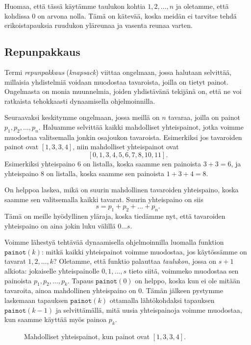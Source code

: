 Huomaa, että tässä käytämme taulukon kohtia $1,2,\dots,n$
ja oletamme, että kohdissa $0$ on arvona nolla.
Tämä on kätevää, koska meidän ei tarvitse tehdä erikoistapauksia
ruudukon yläreunaa ja vasenta reunaa varten.

\subsection{Repunpakkaus}


Termi \emph{repunpakkaus} (\emph{knapsack}) viittaa ongelmaan,
jossa halutaan selvittää, millaisia yhdistelmiä voidaan muodostaa tavaroista,
joilla on tietyt painot.
Ongelmasta on monia muunnelmia, joiden yhdistävänä tekijänä on,
että ne voi ratkaista tehokkaasti dynaamisella ohjelmoinnilla.

Seuraavaksi keskitymme ongelmaan, jossa meillä on $n$ tavaraa,
joilla on painot $p_1,p_2,\dots,p_n$.
Haluamme selvittää kaikki mahdolliset yhteispainot,
jotka voimme muodostaa valitsemalla jonkin osajoukon tavaroista.
Esimerkiksi jos tavaroiden painot ovat $[1,3,3,4]$,
niin mahdolliset yhteispainot ovat
\[[0,1,3,4,5,6,7,8,10,11].\]
Esimerkiksi yhteispaino $6$ on listalla,
koska saamme sen painoista $3+3=6$,
ja yhteispaino $8$ on listalla,
koska saamme sen painoista $1+3+4=8$.

On helppoa laskea, mikä on suurin mahdollinen tavaroiden yhteispaino,
koska saamme sen valitsemalla kaikki tavarat.
Suurin yhteispaino on siis
\[s=p_1+p_2+\dots+p_n.\]
Tämä on meille hyödyllinen yläraja, koska tiedämme nyt,
että tavaroiden yhteispaino on aina jokin luku välillä $0 \dots s$.

Voimme lähestyä tehtävää dynaamisella ohjelmoinnilla luomalla
funktion $\texttt{painot}(k)$: mitkä kaikki yhteispainot voimme
muodostaa, jos käytös\-sämme on tavarat $1,2,\dots,k$?
Oletamme, että funktio palauttaa \emph{taulukon}, jossa on $s+1$ alkiota:
jokaiselle yhteispainolle $0,1,\dots,s$ tieto siitä,
voimmeko muodostaa sen painoista $p_1,p_2,\dots,p_k$.
Tapaus $\texttt{painot}(0)$ on helppo,
koska kun ei ole mitään tavaroita,
ainoa mahdollinen yhteispaino on $0$.
Tämän jälkeen pystymme laskemaan tapauksen $\texttt{painot}(k)$
ottamalla lähtökohdaksi tapauksen $\texttt{painot}(k-1)$
ja selvittämällä, mitä uusia yhteispainoja voimme muodostaa,
kun saamme käyttää myös painoa $p_k$.

\begin{figure}
\center
{}
\caption{Mahdolliset yhteispainot, kun painot ovat $[1,3,3,4]$.}
\label{fig:reppak}
\end{figure}

